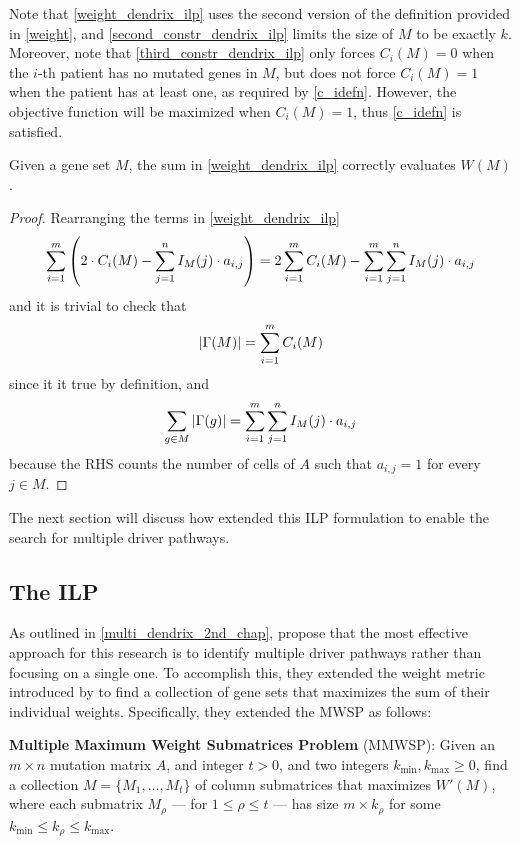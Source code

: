 Note that \cref{weight_dendrix_ilp} uses the second version of the definition provided in \cref{weight}, and \cref{second_constr_dendrix_ilp} limits the size of $M$ to be exactly $k$. Moreover, note that \cref{third_constr_dendrix_ilp} only forces $C_i(M) = 0$ when the $i$-th patient has no mutated genes in $M$, but does not force $C_i(M) = 1$ when the patient has at least one, as required by \cref{c_idefn}. However, the objective function will be maximized when $C_i(M)=1$, thus \cref{c_idefn} is satisfied.

\begin{lemma} Given a gene set $M$, the sum in \cref{weight_dendrix_ilp} correctly evaluates $W(M)$.
\end{lemma}

\begin{proof}
    Rearranging the terms in \cref{weight_dendrix_ilp} $$\sum_{i = 1}^m {\left(2 \cdot C_i(M) - \sum_{j = 1}^n I_M(j) \cdot a_{i, j}\right)} = 2\sum_{i = 1}^m {C_i(M)} - \sum_{i = 1}^m {\sum_{j = 1}^n {I_M(j) \cdot a_{i, j}}}$$ and it is trivial to check that $$\left|\Gamma(M)\right| = \sum_{i = 1}^m {C_i(M)}$$ since it it true by definition, and $$\sum_{g \in M}{\left|\Gamma(g)\right|} = \sum_{i = 1}^m {\sum_{j = 1}^n {I_M(j) \cdot a_{i, j}}}$$ because the RHS counts the number of cells of $A$ such that $a_{i, j} = 1$ for every $j \in M$.
\end{proof}

The next section will discuss how \textcite{multi-dendrix} extended this ILP formulation to enable the search for multiple driver pathways.

\subsection{The ILP}

As outlined in \cref{multi_dendrix_2nd_chap}, \textcite{multi-dendrix} propose that the most effective approach for this research is to identify multiple driver pathways rather than focusing on a single one. To accomplish this, they extended the weight metric introduced by \textcite{dendrix} to find a collection of gene sets that maximizes the sum of their individual weights. Specifically, they extended the MWSP as follows:

\begin{displayquote}
    \textbf{Multiple Maximum Weight Submatrices Problem} (MMWSP): Given an $m \times n$ mutation matrix $A$, and integer $t > 0$, and two integers $k_{\mathrm{min}}, k_{\mathrm{max}} \ge 0$, find a collection $M = \{M_1, \ldots, M_t\}$ of column submatrices that maximizes $W'(M)$, where each submatrix $M_\rho$ --- for $1 \le \rho \le t$ ---  has size $m \times k_\rho$ for some $k_{\mathrm{min}} \le k_\rho \le k_{\mathrm{max}}$.
\end{displayquote}

